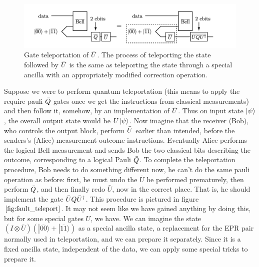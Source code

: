 \begin{figure}[h!]
    \centering
    \includegraphics[width=\textwidth]{Mainmatter/images/teleportation_fault.png}
    \caption{Gate teleportation of $\Bar{U}$. The process of teleporting the state followed by $\Bar{U}$ is the same as teleporting the state through a special ancilla with an appropriately modified correction operation.}
    \label{fig:fault_teleport}
\end{figure}
Suppose we were to perform quantum teleportation (this means to apply the require pauli $\Bar{Q}$ gates once we get the instructions from classical measurements) and then follow it, somehow, by an implementation of $\Bar{U}$. Thus on input state $\ket{\psi}$, the overall output state would be $U\ket{\psi}$. 
Now imagine that the receiver (Bob), who controls the output block, perform $\Bar{U}$ earlier than intended, before the senders’s (Alice) measurement outcome instructions.
Eventually Alice performs the logical Bell measurement and sends Bob the two classical bits describing the outcome, corresponding to a logical Pauli $\Bar{Q}$.
To complete the teleportation procedure, Bob needs to do something different now, he can't do the same pauli operation as before: first, he must undo the $\bar{U}$ he performed prematurely, then perform $\Bar{Q}$, and then finally redo $\bar{U}$, now in the correct place. That is, he should implement the gate $\Bar{U}Q\Bar{U}^{\dagger}$. This procedure is pictured in figure $\ref{fig:fault_teleport}$. It may not seem like we have gained anything by doing this, but for some special gates $U$, we have. We can imagine the state $(I \otimes \bar{U})(|\overline{00}\rangle+|\overline{11}\rangle)$ as a special ancilla state, a replacement for the EPR pair normally used in teleportation, and we can prepare it separately. Since it is a fixed ancilla state, independent of the data, we can apply some special tricks to prepare it.

